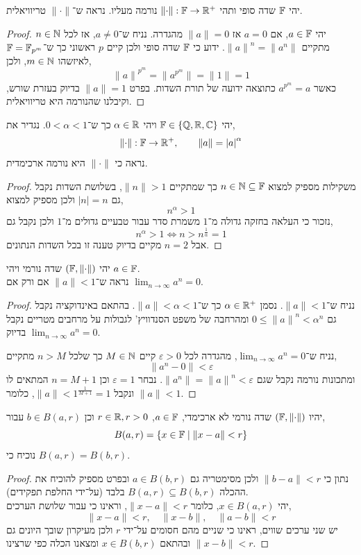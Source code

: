 \question{}
יהי $\mathbb{F}$ שדה סופי ותהי $\lVert \cdot \rVert : \mathbb{F} \to \mathbb{R}^+$ נורמה מעליו.
נראה ש־$\lVert \cdot \rVert$ טריוויאלית.
\begin{proof}
	יהי $a \in \mathbb{F}$, אם $a = 0$ אז $\lVert a \rVert = 0$ מהגדרה.
	נניח ש־$a \ne 0$, אז לכל $n \in \mathbb{N}$ מתקיים ${\lVert a \rVert}^n = \lVert a^n \rVert$.
	ידוע כי $\mathbb{F}$ שדה סופי ולכן קיים $p$ ראשוני כך ש־$\mathbb{F} = \mathbb{F}_{p^m}$ לאיזשהו $m \in \mathbb{N}$, ולכן,
	\[
		{\lVert a \rVert}^{p^m}
		= \lVert a^{p^m} \rVert
		= \lVert 1 \rVert
		= 1
	\]
	כאשר $a^{p^m} = a$ כתוצאה ידועה של תורת השדות.
	בפרט $\lVert a \rVert = 1$ בדיוק בעזרת שורש, וקיבלנו שהנורמה היא טריוויאלית.
\end{proof}

\question{}
יהי $\mathbb{F} \in \{ \mathbb{Q}, \mathbb{R}, \mathbb{C} \}$ ויהי $\alpha \in \mathbb{R}$ כך ש־$0 < \alpha < 1$.
נגדיר את,
\[
	\lVert \cdot \rVert : \mathbb{F} \to \mathbb{R}^+,
	\qquad
	\lVert a \rVert = {| a |}^\alpha
\]
נראה כי $\lVert \cdot \rVert$ היא נורמה ארכימדית.
\begin{proof}
	משקילות מספיק למצוא $n \in \mathbb{N} \subseteq \mathbb{F}$ כך שמתקיים $\lVert n \rVert > 1$, בשלושת השדות נקבל גם $| n | = n$ ולכן מספיק למצוא,
	\[
		n^\alpha > 1
	\]
	נזכור כי העלאה בחזקה גדולה מ־$1$ משמרת סדר עבור טבעיים גדולים מ־$1$ ולכן נקבל גם,
	\[
		n^\alpha > 1
		\iff n > n^{\frac{1}{\alpha}}
		= 1
	\]
	אבל $n = 2$ מקיים בדיוק טענה זו בכל השדות הנתונים.
\end{proof}

\question{}
יהי $(\mathbb{F}, \lVert \cdot \rVert)$ שדה נורמי ויהי $a \in \mathbb{F}$. \\
נראה ש־$\lVert a \rVert < 1$ אם ורק אם $\lim_{n \to \infty} a^n = 0$.
\begin{proof}
	נניח ש־$\lVert a \rVert < 1$.
	נסמן $\alpha \in \mathbb{R}^+$ כך ש־$\lVert a \rVert < \alpha < 1$.
	בהתאם באינדוקציה נקבל גם $0 \le {\lVert a \rVert}^n < \alpha^n$ ומהרחבה של משפט הסנדוויץ' לגבולות על מרחבים מטריים נקבל $\lim_{n \to \infty} a^n = 0$ בדיוק.

	נניח ש־$\lim_{n \to \infty} a^n = 0$, מהגדרה לכל $\varepsilon > 0$ קיים $M \in \mathbb{N}$ כך שלכל $n > M$ מתקיים,
	\[
		\lVert a^n - 0 \rVert
		< \varepsilon
	\]
	ומתכונות נורמה נקבל שגם $\lVert a^n \rVert = {\lVert a \rVert}^n < \varepsilon$.
	נבחר $\varepsilon = 1$ וכן $n = M + 1$ המתאים לו ונקבל $\lVert a \rVert < 1^{\frac{1}{M + 1}} = 1$, כלומר $\lVert a \rVert < 1$.
\end{proof}

\question{}
יהיו $(\mathbb{F}, \lVert \cdot \rVert)$ שדה נורמי לא ארכימדי, $a \in \mathbb{F}$, $r \in \mathbb{R}, r > 0$ וכן $b \in B(a, r)$ עבור,
\[
	B(a, r)
	= \{ x \in \mathbb{F} \mid \lVert x - a \rVert < r \}
\]
נוכיח כי $B(a, r) = B(b, r)$.
\begin{proof}
	נתון כי $\lVert b - a \rVert < r$ ולכן מסימטריה גם $a \in B(b, r)$ ובפרט מספיק להוכיח את ההכלה $B(a, r) \subseteq B(b, r)$ בלבד (על־ידי החלפת תפקידים). \\
	יהי $x \in B(a, r)$, כלומר $\lVert x - a \rVert < r$, וראינו כי עבור שלושת הערכים,
	\[
		\lVert x - a \rVert < r,
		\quad
		\lVert x - b \rVert,
		\quad
		\lVert a - b \rVert < r
	\]
	יש שני ערכים שווים, ראינו כי שניים מהם חסומים על־ידי $r$ ולכן מעיקרון שובך היונים גם $\lVert x - b \rVert < r$ ובהתאם $x \in B(b, r)$ ומצאנו הכלה כפי שרצינו.
\end{proof}

